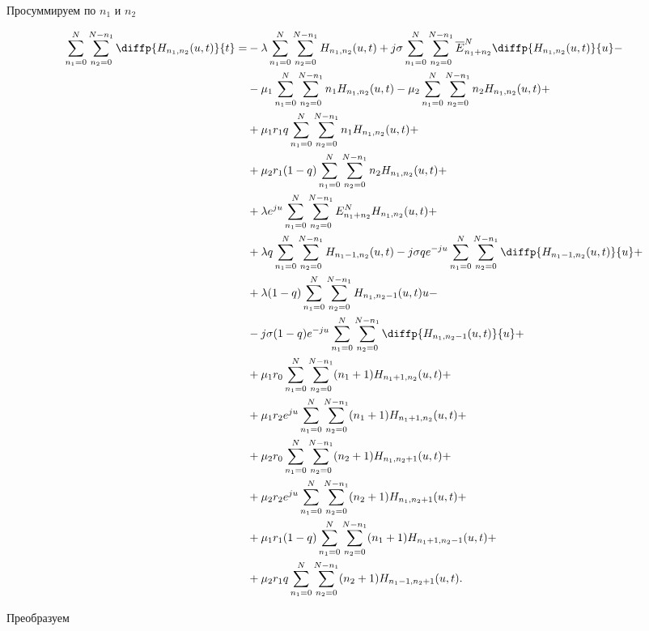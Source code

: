 Просуммируем по $n_{1}$ и $n_{2}$

\begin{equation*}
\begin{aligned}
	\sum_{n_1=0}^N \sum_{n_2=0}^{N-n_1}\diffp{H_{n_1,n_2}(u,t)}{t}=
	&-\lambda \sum_{n_1=0}^N\sum_{n_2=0}^{N-n_1}
	H_{n_1, n_2}(u,t)
	+j\sigma \sum_{n_1=0}^N\sum_{n_2=0}^{N-n_1}
	\overline{E}^N_{n_1+n_2}\diffp{H_{n_1, n_2}(u,t)}{u}-\\
	&-\mu_1 \sum_{n_1=0}^N\sum_{n_2=0}^{N-n_1}
	n_1 H_{n_1, n_2}(u,t)
	-\mu_2 \sum_{n_1=0}^N\sum_{n_2=0}^{N-n_1}
	n_2 H_{n_1, n_2}(u,t)+\\
	&+\mu_1 r_1 q \sum_{n_1=0}^N\sum_{n_2=0}^{N-n_1}
	n_1 H_{n_1, n_2}(u,t)+\\
	&+\mu_2 r_1 (1-q)\sum_{n_1=0}^N\sum_{n_2=0}^{N-n_1} 
	n_2 H_{n_1, n_2}(u,t)+\\
	&+\lambda e^{ju}\sum_{n_1=0}^N\sum_{n_2=0}^{N-n_1}
	E^N_{n_1+n_2}H_{n_1, n_2}(u,t)+\\
	&+\lambda q \sum_{n_1=0}^N\sum_{n_2=0}^{N-n_1}
	H_{n_1-1, n_2}(u,t)-j \sigma q e^{-ju}\sum_{n_1=0}^N\sum_{n_2=0}^{N-n_1}
	\diffp{H_{n_1-1, n_2}(u,t)}{u}+\\
	&+\lambda (1-q) \sum_{n_1=0}^N\sum_{n_2=0}^{N-n_1}
	H_{n_1, n_2-1}(u,t){u}-\\
	&-j \sigma (1-q) e^{-ju}\sum_{n_1=0}^N\sum_{n_2=0}^{N-n_1}
	\diffp{H_{n_1, n_2-1}(u,t)}{u}+\\
	&+\mu_1 r_0 \sum_{n_1=0}^N\sum_{n_2=0}^{N-n_1}
	(n_1+1) H_{n_1+1, n_2}(u,t)+\\
	&+\mu_1 r_2 e^{ju} \sum_{n_1=0}^N\sum_{n_2=0}^{N-n_1}
	(n_1+1) H_{n_1+1, n_2}(u,t)+\\
	&+\mu_2 r_0 \sum_{n_1=0}^N\sum_{n_2=0}^{N-n_1}
	(n_2+1) H_{n_1, n_2+1}(u,t)+\\
	&+\mu_2 r_2 e^{ju} \sum_{n_1=0}^N\sum_{n_2=0}^{N-n_1}
	(n_2+1) H_{n_1, n_2+1}(u,t)+\\
	&+\mu_1 r_1 (1-q) \sum_{n_1=0}^N\sum_{n_2=0}^{N-n_1}
	(n_1+1)H_{n_1+1, n_2-1}(u,t)+\\
	&+\mu_2 r_1 q \sum_{n_1=0}^N\sum_{n_2=0}^{N-n_1}
	(n_2+1)H_{n_1-1, n_2+1}(u,t).\\	
\end{aligned}
\end{equation*}

Преобразуем

